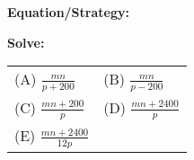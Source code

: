 \begin{multicols*}{2}
\begin{outline}[enumerate]
\bigskip
\textbf{Equation/Strategy:} \hrulefill

\bigskip
\textbf{Solve:}

\vfill
\begin{spacing}{2.75}
\begin{tabularx}{0.4\textwidth}{*2{@{}X}}
(A) $\frac{mn}{p+200}$ & (B) $\frac{mn}{p-200}$\\
(C) $\frac{mn+200}{p}$ & (D) $\frac{mn+2400}{p}$\\
(E) $\frac{mn+2400}{12p}$
\end{tabularx}
\end{spacing}
\end{outline}
\end{multicols*}